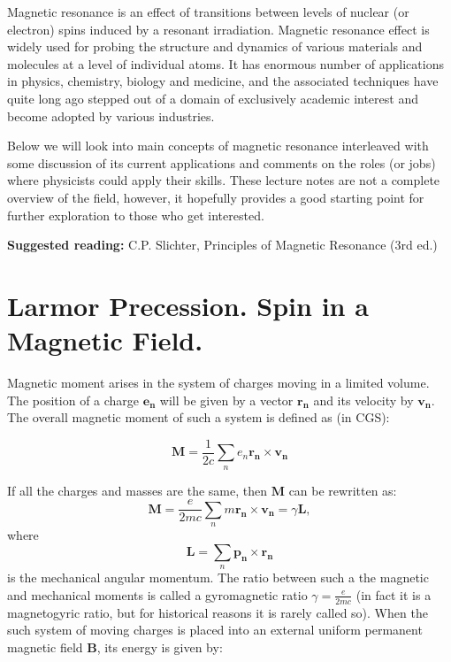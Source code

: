\documentclass[a4paper, 12pt]{article}
\begin{document}
Magnetic resonance is an effect of transitions between levels of nuclear (or electron) spins induced by a resonant irradiation. Magnetic resonance effect is  widely used for probing the structure and dynamics of various materials and molecules at a level of individual atoms. It has enormous number of applications in physics, chemistry, biology and medicine, and the associated techniques have quite long ago stepped out of a domain of exclusively academic interest and become adopted by various industries.

Below we will look into main concepts of magnetic resonance interleaved with some discussion of its current applications and comments on the roles (or jobs) where physicists could apply their skills. These lecture notes are not a complete overview of the field, however, it hopefully provides a good starting point for further exploration to those who get interested.

\textbf{Suggested reading:} C.P. Slichter, Principles of Magnetic Resonance (3rd ed.)

\section{Larmor Precession. Spin in a Magnetic Field.}
Magnetic moment arises in the system of charges moving in a limited volume. The position of a charge $\bm{e_n}$ will be given by a vector $\bm{r_n}$ and its velocity by $\bm{v_n}$. The overall magnetic moment of such a system is defined as (in CGS):

\begin{equation}
\bm{M} = \frac{1}{2c} \sum_{n} e_n\bm{r_n} \times \bm{v_n}
\end{equation}

If all the charges and masses are the same, then $\bm{M}$ can be rewritten as:
\begin{equation} \label{eq:1}
\bm{M} = \frac{e}{2mc} \sum_{n} m\bm{r_n} \times \bm{v_n} = \gamma \bm{L},
\end{equation}
where
\begin{equation}
\bm{L} = \sum_{n} \bm{p_n} \times \bm{r_n}
\end{equation}
is the mechanical angular momentum. The ratio between such a the magnetic and mechanical moments is called a gyromagnetic ratio $\gamma = \frac{e}{2mc}$ (in fact it is a magnetogyric ratio, but for historical reasons it is rarely called so).
When the such system of moving charges is placed into an external uniform permanent magnetic field $\bm{B}$, its energy is given by:
\end{document}
